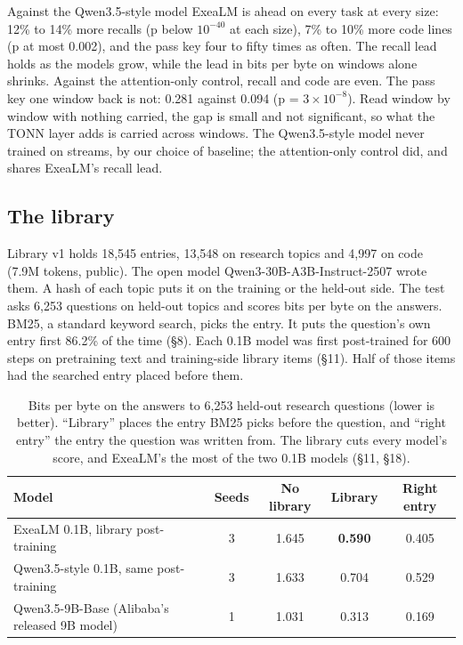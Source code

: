 \documentclass[11pt,letterpaper]{article}
\newcommand{\sect}[1]{\S#1}
\begin{document}
Against the Qwen3.5-style model ExeaLM is ahead on every task at every size: 12\% to 14\% more recalls (p below $10^{-40}$ at each size), 7\% to 10\% more code lines (p at most 0.002), and the pass key four to fifty times as often.
The recall lead holds as the models grow, while the lead in bits per byte on windows alone shrinks.
Against the attention-only control, recall and code are even. The pass key one window back is not: 0.281 against 0.094 (p = $3\times10^{-8}$). Read window by window with nothing carried, the gap is small and not significant, so what the TONN layer adds is carried across windows.
The Qwen3.5-style model never trained on streams, by our choice of baseline; the attention-only control did, and shares ExeaLM's recall lead.

\subsection{The library}

Library v1 holds 18,545 entries, 13,548 on research topics and 4,997 on code (7.9M tokens, public).
The open model Qwen3-30B-A3B-Instruct-2507 wrote them.
A hash of each topic puts it on the training or the held-out side.
The test asks 6,253 questions on held-out topics and scores bits per byte on the answers.
BM25, a standard keyword search, picks the entry.
It puts the question's own entry first 86.2\% of the time (\sect{8}).
Each 0.1B model was first post-trained for 600 steps on pretraining text and training-side library items (\sect{11}).
Half of those items had the searched entry placed before them.

\begin{table}[!htb]
\centering\small
\caption{Bits per byte on the answers to 6,253 held-out research questions (lower is better). ``Library'' places the entry BM25 picks before the question, and ``right entry'' the entry the question was written from. The library cuts every model's score, and ExeaLM's the most of the two 0.1B models (\sect{11}, \sect{18}).}
\label{tab:library}
\begin{tabularx}{\linewidth}{@{}L c c c c@{}}
\toprule
Model & Seeds & No library & Library & Right entry \\
\midrule
ExeaLM 0.1B, library post-training & 3 & 1.645 & \textbf{0.590} & 0.405 \\
Qwen3.5-style 0.1B, same post-training & 3 & 1.633 & 0.704 & 0.529 \\
Qwen3.5-9B-Base (Alibaba's released 9B model) & 1 & 1.031 & 0.313 & 0.169 \\
\bottomrule
\end{tabularx}
\end{table}
\end{document}
